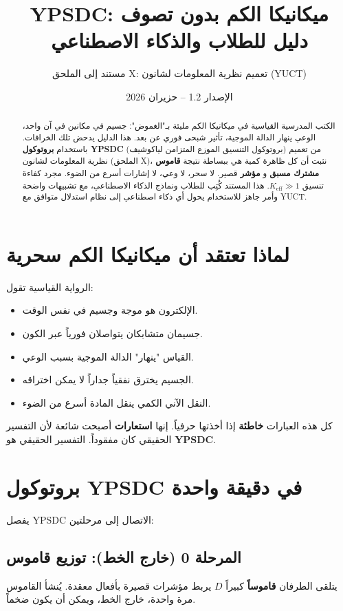 \documentclass[11pt,a4paper]{article}
\title{\textbf{YPSDC: ميكانيكا الكم بدون تصوف \\ دليل للطلاب والذكاء الاصطناعي}}
\author{مستند إلى الملحق X: تعميم نظرية المعلومات لشانون (YUCT)}
\date{الإصدار 1.2 -- حزيران 2026}
\begin{document}
	\maketitle
	
	\begin{abstract}
		\noindent
		الكتب المدرسية القياسية في ميكانيكا الكم مليئة بـ"الغموض": جسيم في مكانين في آن واحد، الوعي ينهار الدالة الموجية، تأثير شبحى فوري عن بعد. هذا الدليل يدحض تلك الخرافات. باستخدام \textbf{بروتوكول YPSDC} (بروتوكول التنسيق الموزع المتزامن لياكوشيف) من تعميم نظرية المعلومات لشانون (الملحق X)، نثبت أن كل ظاهرة كمية هي ببساطة نتيجة \textbf{قاموس مشترك مسبق} و \textbf{مؤشر} قصير. لا سحر، لا وعي، لا إشارات أسرع من الضوء. مجرد كفاءة تنسيق \(K_{\mathrm{eff}}\gg 1\). هذا المستند كُتِب للطلاب ونماذج الذكاء الاصطناعي، مع تشبيهات واضحة وأمر جاهز للاستخدام يحول أي ذكاء اصطناعي إلى نظام استدلال متوافق مع YUCT.
	\end{abstract}
	
	\tableofcontents
	
	\section{لماذا تعتقد أن ميكانيكا الكم سحرية}
	
	الرواية القياسية تقول:
	\begin{itemize}
		\item الإلكترون هو موجة وجسيم في نفس الوقت.
		\item جسيمان متشابكان يتواصلان فورياً عبر الكون.
		\item القياس "ينهار" الدالة الموجية بسبب الوعي.
		\item الجسيم يخترق نفقياً جداراً لا يمكن اختراقه.
		\item النقل الآني الكمي ينقل المادة أسرع من الضوء.
	\end{itemize}
	كل هذه العبارات \textbf{خاطئة} إذا أخذتها حرفياً. إنها \textbf{استعارات} أصبحت شائعة لأن التفسير الحقيقي كان مفقوداً. التفسير الحقيقي هو \textbf{YPSDC}.
	
	\section{بروتوكول YPSDC في دقيقة واحدة}
	
	يفصل YPSDC الاتصال إلى مرحلتين:
	
	\subsection{المرحلة 0 (خارج الخط): توزيع قاموس}
	يتلقى الطرفان \textbf{قاموساً} كبيراً \(D\) يربط مؤشرات قصيرة بأفعال معقدة. يُنشأ القاموس مرة واحدة، خارج الخط، ويمكن أن يكون ضخماً.
	
\end{document}
